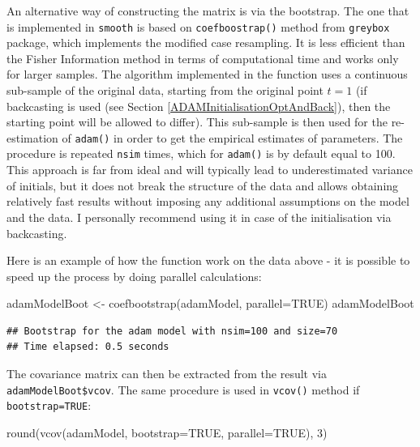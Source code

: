 \documentclass[
]{book}
\newenvironment{Shaded}{\begin{snugshade}}{\end{snugshade}}
\newcommand{\AttributeTok}[1]{\textcolor[rgb]{0.77,0.63,0.00}{#1}}
\newcommand{\ConstantTok}[1]{\textcolor[rgb]{0.00,0.00,0.00}{#1}}
\newcommand{\DecValTok}[1]{\textcolor[rgb]{0.00,0.00,0.81}{#1}}
\newcommand{\FunctionTok}[1]{\textcolor[rgb]{0.00,0.00,0.00}{#1}}
\newcommand{\NormalTok}[1]{#1}
\newcommand{\OtherTok}[1]{\textcolor[rgb]{0.56,0.35,0.01}{#1}}
\theoremstyle{definition}
\theoremstyle{definition}
\theoremstyle{definition}
\theoremstyle{definition}
\theoremstyle{remark}
\begin{document}
An alternative way of constructing the matrix is via the bootstrap. The one that is implemented in \texttt{smooth} is based on \texttt{coefboostrap()} method from \texttt{greybox} package, which implements the modified case resampling. It is less efficient than the Fisher Information method in terms of computational time and works only for larger samples. The algorithm implemented in the function uses a continuous sub-sample of the original data, starting from the original point \(t=1\) (if backcasting is used (see Section \ref{ADAMInitialisationOptAndBack}), then the starting point will be allowed to differ). This sub-sample is then used for the re-estimation of \texttt{adam()} in order to get the empirical estimates of parameters. The procedure is repeated \texttt{nsim} times, which for \texttt{adam()} is by default equal to 100. This approach is far from ideal and will typically lead to underestimated variance of initials, but it does not break the structure of the data and allows obtaining relatively fast results without imposing any additional assumptions on the model and the data. I personally recommend using it in case of the initialisation via backcasting.

Here is an example of how the function work on the data above - it is possible to speed up the process by doing parallel calculations:

\begin{Shaded}
\begin{Highlighting}[]
\NormalTok{adamModelBoot }\OtherTok{\textless{}{-}} \FunctionTok{coefbootstrap}\NormalTok{(adamModel, }\AttributeTok{parallel=}\ConstantTok{TRUE}\NormalTok{)}
\NormalTok{adamModelBoot}
\end{Highlighting}
\end{Shaded}

\begin{verbatim}
## Bootstrap for the adam model with nsim=100 and size=70
## Time elapsed: 0.5 seconds
\end{verbatim}

The covariance matrix can then be extracted from the result via \texttt{adamModelBoot\$vcov}. The same procedure is used in \texttt{vcov()} method if \texttt{bootstrap=TRUE}:

\begin{Shaded}
\begin{Highlighting}[]
\FunctionTok{round}\NormalTok{(}\FunctionTok{vcov}\NormalTok{(adamModel, }\AttributeTok{bootstrap=}\ConstantTok{TRUE}\NormalTok{, }\AttributeTok{parallel=}\ConstantTok{TRUE}\NormalTok{), }\DecValTok{3}\NormalTok{)}
\end{Highlighting}
\end{Shaded}
\end{document}

